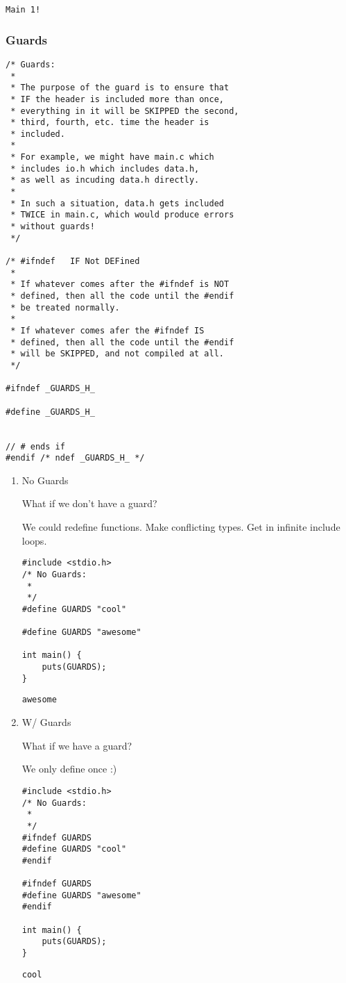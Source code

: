 \documentclass[11pt]{article}
\begin{document}
\begin{verbatim}
Main 1!
\end{verbatim}

\subsubsection{Guards}
\label{sec:org1fe58b6}

\begin{verbatim}
/* Guards:
 * 
 * The purpose of the guard is to ensure that
 * IF the header is included more than once,
 * everything in it will be SKIPPED the second,
 * third, fourth, etc. time the header is
 * included.
 * 
 * For example, we might have main.c which
 * includes io.h which includes data.h,
 * as well as incuding data.h directly.
 * 
 * In such a situation, data.h gets included
 * TWICE in main.c, which would produce errors
 * without guards!
 */

/* #ifndef   IF Not DEFined
 * 
 * If whatever comes after the #ifndef is NOT
 * defined, then all the code until the #endif
 * be treated normally.
 * 
 * If whatever comes afer the #ifndef IS
 * defined, then all the code until the #endif
 * will be SKIPPED, and not compiled at all.
 */

#ifndef _GUARDS_H_

#define _GUARDS_H_


// # ends if
#endif /* ndef _GUARDS_H_ */
\end{verbatim}


\begin{enumerate}
\item No Guards
\label{sec:org7cd7f39}

What if we don't have a guard?

We could redefine functions. Make conflicting types. Get in infinite
include loops.

\begin{verbatim}
#include <stdio.h>
/* No Guards:
 * 
 */
#define GUARDS "cool"

#define GUARDS "awesome"

int main() {
    puts(GUARDS);
}
\end{verbatim}

\begin{verbatim}
awesome
\end{verbatim}

\item W/ Guards
\label{sec:orgbea1419}

What if we have a guard?

We only define once :)

\begin{verbatim}
#include <stdio.h>
/* No Guards:
 * 
 */
#ifndef GUARDS
#define GUARDS "cool"
#endif

#ifndef GUARDS
#define GUARDS "awesome"
#endif

int main() {
    puts(GUARDS);
}
\end{verbatim}

\begin{verbatim}
cool
\end{verbatim}
\end{enumerate}
\end{document}

